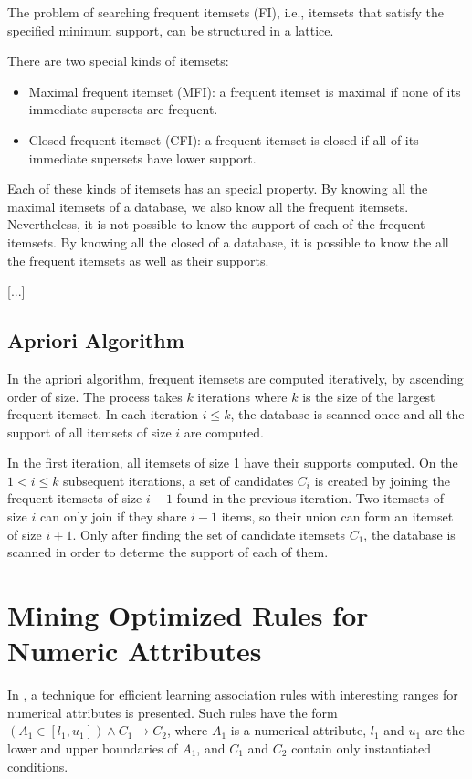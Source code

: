 The problem of searching frequent itemsets (FI), i.e., itemsets that satisfy the specified minimum support, can be
structured in a lattice.


There are two special kinds of itemsets:
\begin{itemize}
 \item Maximal frequent itemset (MFI): a frequent itemset is maximal if none of its immediate supersets are frequent.
 \item Closed frequent itemset (CFI): a frequent itemset is closed if all of its immediate supersets have lower
support.
\end{itemize}

Each of these kinds of itemsets has an special property. By knowing all the maximal itemsets of a database, we
also know all the frequent itemsets. Nevertheless, it is not possible to know the support of each of the frequent
itemsets. By knowing all the closed of a database, it is possible to know the all the frequent itemsets as well as their
supports.

[...]

\subsection{Apriori Algorithm}

In the apriori algorithm, frequent itemsets are computed iteratively, by ascending order of size. The process takes $k$
iterations where $k$ is the size of the largest frequent itemset. In each iteration $i \leq k$, the database is scanned
once and all the support of all itemsets of size $i$ are computed.

In the first iteration, all itemsets of size 1 have their supports computed. On the $1 < i \leq k$ subsequent
iterations, a set of candidates $C_i$ is created by joining the frequent itemsets of size $i-1$ found in the previous
iteration. Two itemsets of size $i$ can only join if they share $i-1$ items, so their union can form an itemset of size
$i+1$. Only after finding the set of candidate itemsets $C_1$, the database is scanned in order to determe the
support of each of them.

\section{Mining Optimized Rules for Numeric Attributes}

In \cite{Brin99miningoptimized}, a technique for efficient learning association rules with interesting ranges for
numerical attributes is presented. Such rules have the form $(A_1 \in [l_1,u_1]) \wedge C_1 \rightarrow C_2$, where
$A_1$ is a numerical attribute, $l_1$ and $u_1$ are the lower and upper boundaries of $A_1$, and $C_1$ and $C_2$ contain
only instantiated conditions.

